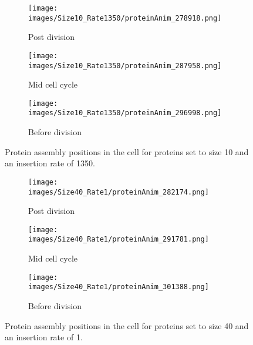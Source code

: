 \begin{figure}[h]
    \centering
    \begin{subfigure}[b]{\textwidth}
        \centering
        \texttt{[image: images/Size10\_Rate1350/proteinAnim\_278918.png]}
        \caption{Post division}
        \label{10_1350_post}
    \end{subfigure}
    \hfill
    \begin{subfigure}[b]{\textwidth}
        \centering
        \texttt{[image: images/Size10\_Rate1350/proteinAnim\_287958.png]}
        \caption{Mid cell cycle}
        \label{10_1350_mid}
    \end{subfigure}
    \vfill
    \begin{subfigure}[b]{\textwidth}
        \centering
        \texttt{[image: images/Size10\_Rate1350/proteinAnim\_296998.png]}
        \caption{Before division}
        \label{10_1350_pre}
    \end{subfigure}
    \caption{
    Protein assembly positions in the cell for proteins set to size 10 and an insertion rate of 1350.
    }
    \label{10_1350_cellcycle}
\end{figure}

\begin{figure}[h]
    \centering
    \begin{subfigure}[b]{\textwidth}
        \centering
        \texttt{[image: images/Size40\_Rate1/proteinAnim\_282174.png]}
        \caption{Post division}
        \label{40_1_post}
    \end{subfigure}
    \vfill
    \begin{subfigure}[b]{\textwidth}
        \centering
        \texttt{[image: images/Size40\_Rate1/proteinAnim\_291781.png]}
        \caption{Mid cell cycle}
        \label{40_1_mid}
    \end{subfigure}
    \vfill
    \begin{subfigure}[b]{\textwidth}
        \centering
        \texttt{[image: images/Size40\_Rate1/proteinAnim\_301388.png]}
        \caption{Before division}
        \label{40_1_pre}
    \end{subfigure}
    \caption{
    Protein assembly positions in the cell for proteins set to size 40 and an insertion rate of 1.
    }
    \label{40_1_cellcycle}
\end{figure}

